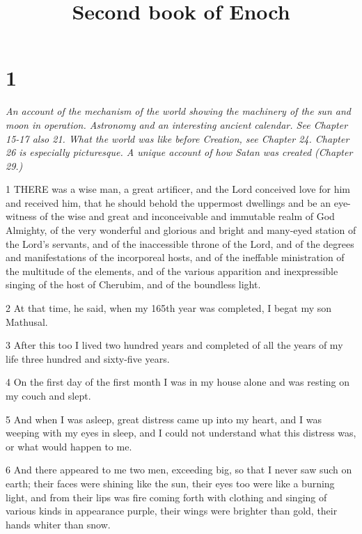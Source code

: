 

\title{Second book of Enoch}

\chapter{1}

\par \textit{An account of the mechanism of the world showing the machinery of the sun and moon in operation. Astronomy and an interesting ancient calendar. See Chapter 15-17 also 21. What the world was like before Creation, see Chapter 24. Chapter 26 is especially picturesque. A unique account of how Satan was created (Chapter 29.)}

\par 1 THERE was a wise man, a great artificer, and the Lord conceived love for him and received him, that he should behold the uppermost dwellings and be an eye-witness of the wise and great and inconceivable and immutable realm of God Almighty, of the very wonderful and glorious and bright and many-eyed station of the Lord's servants, and of the inaccessible throne of the Lord, and of the degrees and manifestations of the incorporeal hosts, and of the ineffable ministration of the multitude of the elements, and of the various apparition and inexpressible singing of the host of Cherubim, and of the boundless light.

\par 2 At that time, he said, when my 165th year was completed, I begat my son Mathusal.

\par 3 After this too I lived two hundred years and completed of all the years of my life three hundred and sixty-five years.

\par 4 On the first day of the first month I was in my house alone and was resting on my couch and slept.

\par 5 And when I was asleep, great distress came up into my heart, and I was weeping with my eyes in sleep, and I could not understand what this distress was, or what would happen to me.

\par 6 And there appeared to me two men, exceeding big, so that I never saw such on earth; their faces were shining like the sun, their eyes too were like a burning light, and from their lips was fire coming forth with clothing and singing of various kinds in appearance purple, their wings were brighter than gold, their hands whiter than snow.

